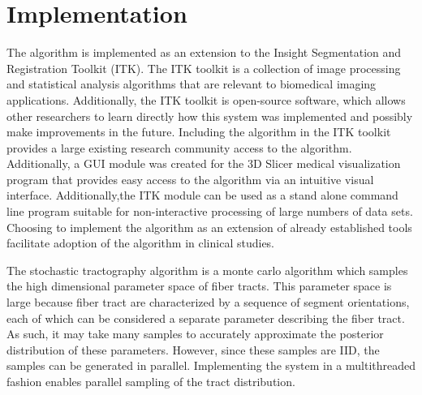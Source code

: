 \chapter{Implementation}

The algorithm is implemented as an extension to the Insight Segmentation and Registration Toolkit (ITK).  The ITK toolkit is a collection of image processing and statistical analysis algorithms that are relevant to biomedical imaging applications.  Additionally, the ITK toolkit is open-source software, which allows other researchers to learn directly how this system was implemented and possibly make improvements in the future.  Including the algorithm in the ITK toolkit provides a large existing research community access to the algorithm.  Additionally, a GUI module was created for the 3D Slicer medical visualization program that provides easy access to the algorithm via an intuitive visual interface.  Additionally,the ITK module can be used as a stand alone command line program suitable for non-interactive processing of large numbers of data sets.  Choosing to implement the algorithm as an extension of already established tools facilitate adoption of the algorithm in clinical studies.

The stochastic tractography algorithm is a monte carlo algorithm which samples the high dimensional parameter space of fiber tracts.  This parameter space is large because fiber tract are characterized by a sequence of segment orientations, each of which can be considered a separate parameter describing the fiber tract.  As such, it may take many samples to accurately approximate the posterior distribution of these parameters.  However, since these samples are IID, the samples can be generated in parallel.  Implementing the system in a multithreaded fashion enables parallel sampling of the tract distribution.

